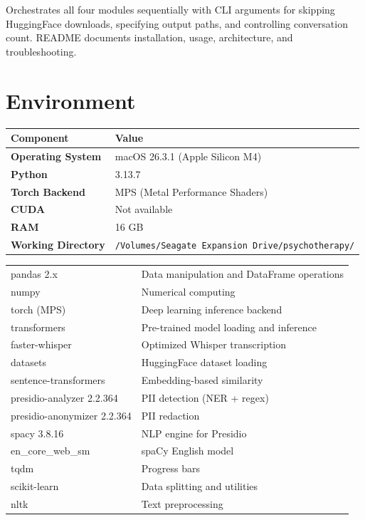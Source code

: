 \documentclass[11pt,a4paper]{article}
\begin{document}
Orchestrates all four modules sequentially with CLI arguments for skipping HuggingFace downloads, specifying output paths, and controlling conversation count. README documents installation, usage, architecture, and troubleshooting.

\section{Environment}

\begin{center}
\begin{tcolorbox}[colback=white, colframe=darkbg!50, enhanced, breakable, title=Runtime Environment, fonttitle=\sffamily\bfseries]
\begin{tabular}{>{\sffamily\bfseries}p{4cm}p{8cm}}
\toprule
\textbf{Component} & \textbf{Value} \\
\midrule
Operating System & macOS 26.3.1 (Apple Silicon M4) \\
Python & 3.13.7 \\
Torch Backend & MPS (Metal Performance Shaders) \\
CUDA & Not available \\
RAM & 16 GB \\
Working Directory & \texttt{/Volumes/Seagate Expansion Drive/psychotherapy/} \\
\bottomrule
\end{tabular}
\end{tcolorbox}
\end{center}

\begin{tcolorbox}[infoBox={Installed Packages}]
\begin{tabular}{@{}p{4cm}p{8cm}}
pandas 2.x & Data manipulation and DataFrame operations \\
numpy & Numerical computing \\
torch (MPS) & Deep learning inference backend \\
transformers & Pre-trained model loading and inference \\
faster-whisper & Optimized Whisper transcription \\
datasets & HuggingFace dataset loading \\
sentence-transformers & Embedding-based similarity \\
presidio-analyzer 2.2.364 & PII detection (NER + regex) \\
presidio-anonymizer 2.2.364 & PII redaction \\
spacy 3.8.16 & NLP engine for Presidio \\
en\_core\_web\_sm & spaCy English model \\
tqdm & Progress bars \\
scikit-learn & Data splitting and utilities \\
nltk & Text preprocessing \\
\end{tabular}
\end{tcolorbox}
\end{document}
